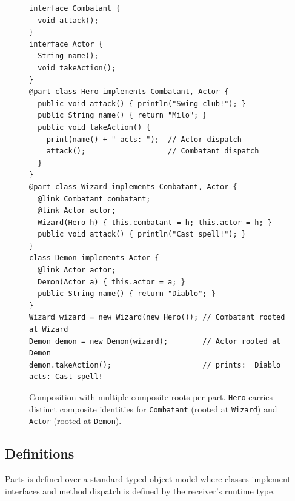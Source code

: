 \documentclass[acmsmall,screen,review,anonymous]{acmart}
\theoremstyle{acmplain}
\newcommand{\code}[1]{\texttt{#1}}
\begin{document}
\begin{figure}[H]
\begin{lstlisting}
interface Combatant {
  void attack();
}
interface Actor {
  String name();
  void takeAction();
}
@part class Hero implements Combatant, Actor {
  public void attack() { println("Swing club!"); }
  public String name() { return "Milo"; }
  public void takeAction() {
    print(name() + " acts: ");  // Actor dispatch
    attack();                   // Combatant dispatch
  }
}
@part class Wizard implements Combatant, Actor {
  @link Combatant combatant;
  @link Actor actor;
  Wizard(Hero h) { this.combatant = h; this.actor = h; }
  public void attack() { println("Cast spell!"); }
}
class Demon implements Actor {
  @link Actor actor;
  Demon(Actor a) { this.actor = a; }
  public String name() { return "Diablo"; }
}
Wizard wizard = new Wizard(new Hero()); // Combatant rooted at Wizard
Demon demon = new Demon(wizard);        // Actor rooted at Demon
demon.takeAction();                     // prints:  Diablo acts: Cast spell!
\end{lstlisting}
\caption{Composition with multiple composite roots per part.
\code{Hero} carries distinct composite identities for \code{Combatant}
(rooted at \code{Wizard}) and \code{Actor} (rooted at \code{Demon}).}
\label{fig:dag-listing}
\end{figure}

\subsection{Definitions}

Parts is defined over a standard typed object model where classes implement interfaces and method dispatch is defined by
the receiver's runtime type.
\end{document}
